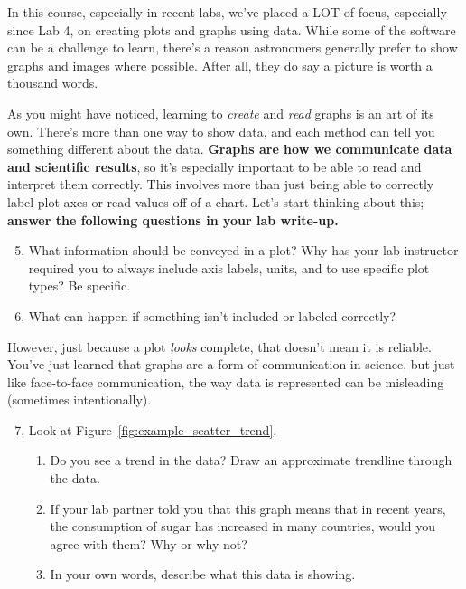 \documentclass[11pt]{article}%
\begin{document}
In this course, especially in recent labs, we've placed a LOT of focus, especially since Lab 4, on creating plots and graphs using data. While some of the software can be a challenge to learn, there's a reason astronomers generally prefer to show graphs and images where possible. After all, they do say a picture is worth a thousand words. 

As you might have noticed, learning to \textit{create} and \textit{read} graphs is an art of its own. There's more than one way to show data, and each method can tell you something different about the data. \textbf{Graphs are how we communicate data and scientific results}, so it's especially important to be able to read and interpret them correctly. This involves more than just being able to correctly label plot axes or read values off of a chart. Let's start thinking about this; \textbf{answer the following questions in your lab write-up.}

\begin{enumerate}
\setcounter{enumi}{4}
    \item What information should be conveyed in a plot? Why has your lab instructor required you to always include axis labels, units, and to use specific plot types? Be specific.



    \item What can happen if something isn't included or labeled correctly?

\end{enumerate}

However, just because a plot \textit{looks} complete, that doesn't mean it is reliable. You've just learned that graphs are a form of communication in science, but just like face-to-face communication, the way data is represented can be misleading (sometimes intentionally). 

\begin{enumerate}
\setcounter{enumi}{6}

\item Look at Figure~\ref{fig:example_scatter_trend}.
    \begin{enumerate}
        \item Do you see a trend in the data? Draw an approximate trendline through the data.
        \item If your lab partner told you that this graph means that in recent years, the consumption of sugar has increased in many countries, would you agree with them? Why or why not?
        \item In your own words, describe what this data is showing. 
    \end{enumerate}
\end{enumerate}
\end{document}
